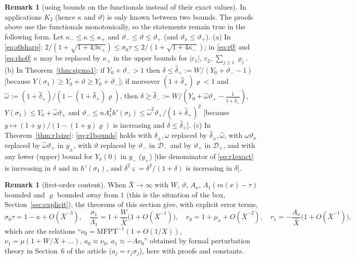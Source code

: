 \documentclass[11pt,a4paper]{article}
\newcommand{\Xb}{\bar X}
\theoremstyle{plain}
\theoremstyle{definition}
\newtheorem{remark}[theorem]{Remark}
\numberwithin{equation}{section}
\begin{document}
\begin{remark}[using bounds on the functionals instead of their exact values]\label{rem:monotone}
In applications $K_2$ (hence $\kappa$ and $\vartheta$) is only known between two bounds. The proofs above use the functionals monotonically, so the statements remain true in the following form. Let $\kappa_-\le\kappa\le\kappa_+$ and $\vartheta_-\le\vartheta\le\vartheta_+$ (and $\vartheta_x\le\vartheta_+$).
(a) In \eqref{eq:s0sharp}: $2/(1+\sqrt{1+4\beta\kappa_+})\le\sigma_0\tau\le2/(1+\sqrt{1+4\kappa_-})$; in \eqref{eq:r0} and \eqref{eq:rho0} $\kappa$ may be replaced by $\kappa_+$ in the upper bounds for $|\varepsilon_1|$, $\varepsilon_2$, $\sum_{j\ge1}\varrho_j$.
(b) In Theorem~\ref{thm:sigma1}: if $Y_0+\vartheta_->1$ then $\delta\le\hat\delta_+:=W/(Y_0+\vartheta_--1)$ [because $Y(\sigma_1)\ge Y_0+\vartheta\ge Y_0+\vartheta_-$]; if moreover $(1+\hat\delta_+)\varrho<1$ and $\hat\omega:=(1+\hat\delta_+)/(1-(1+\hat\delta_+)\varrho)$, then $\delta\ge\hat\delta_-:=W/(Y_0+\hat\omega\vartheta_+-\frac1{1+\hat\delta_+})$, $Y(\sigma_1)\le Y_0+\hat\omega\vartheta_+$ and $\vartheta_-\le n\Lambda_1^2h'(\sigma_1)\le\hat\omega^2\vartheta_+/(1+\hat\delta_+)^2$ [because $y\mapsto(1+y)/(1-(1+y)\varrho)$ is increasing and $\delta\le\hat\delta_+$].
(c) In Theorem~\ref{thm:r1size}: \eqref{eq:r1bounds} holds with $\delta_\pm,\omega$ replaced by $\hat\delta_\pm,\hat\omega$, with $\omega\vartheta_x$ replaced by $\hat\omega\vartheta_+$ in $y_\pm$, with $\vartheta$ replaced by $\vartheta_-$ in $\mathcal D_-$ and by $\vartheta_+$ in $\mathcal D_+$, and with any lower (upper) bound for $Y_x(0)$ in $y_-$ ($y_+$) [the denominator of \eqref{eq:r1exact} is increasing in $\delta$ and in $h'(\sigma_1)$, and $\delta^2\varsigma=\delta^2/(1+\delta)$ is increasing in $\delta$].
\end{remark}

\begin{remark}[first-order content]\label{rem:firstorder}
When $\Xb\to\infty$ with $W$, $\vartheta$, $A_x$, $\Lambda_1(m(x)-\tau)$ bounded and $\varrho$ bounded away from $1$ (this is the situation of the box, Section~\ref{sec:explicit}), the theorems of this section give, with explicit error terms,
\[
\sigma_0\tau=1-\kappa+O(\Xb^{-3}),\quad
\frac{\sigma_1}{\Lambda_1}=1+\frac{W}{\Xb}\big(1+O(\Xb^{-1})\big),\quad
r_0=1+\mu_x+O(\Xb^{-2}),\quad r_1=-\frac{A_x}{\Xb}\big(1+O(\Xb^{-1})\big),
\]
which are the relations ``$\nu_0=\mathrm{MFPT}^{-1}(1+O(1/X))$, $\nu_1=\mu(1+W/X+\dots)$, $a_0\approx\nu_0$, $a_1\approx-A\nu_0$'' obtained by formal perturbation theory in Section~6 of the article ($a_j=r_j\sigma_j$), here with proofs and constants.
\end{remark}
\end{document}

